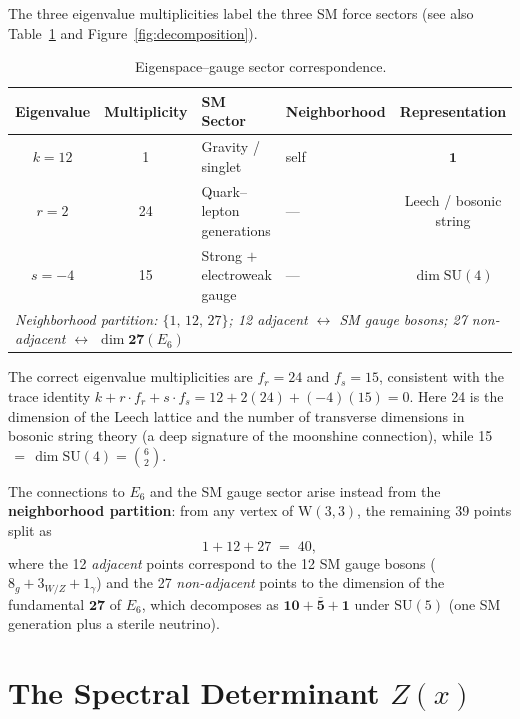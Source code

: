 \documentclass[12pt,a4paper]{article}
\newcommand{\W}{\mathrm{W}(3,3)}
\begin{document}
The three eigenvalue multiplicities label the three SM force sectors
(see also Table~\ref{tab:sectors} and Figure~\ref{fig:decomposition}).

\begin{table}[H]
\centering
\caption{Eigenspace--gauge sector correspondence.}
\label{tab:sectors}
\renewcommand{\arraystretch}{1.25}
\begin{tabular}{@{}ccllc@{}}
\toprule
Eigenvalue & Multiplicity & SM Sector & Neighborhood & Representation \\
\midrule
$k = 12$ & 1 & Gravity / singlet & self & $\mathbf{1}$ \\
$r = 2$ & 24 & Quark--lepton generations & --- & Leech / bosonic string \\
$s = -4$ & 15 & Strong $+$ electroweak gauge & --- & $\dim\mathrm{SU}(4)$ \\
\midrule
\multicolumn{5}{l}{\textit{Neighborhood partition: $\{1,\,12,\,27\}$; 12 adjacent $\leftrightarrow$ SM gauge bosons; 27 non-adjacent $\leftrightarrow$ $\dim\mathbf{27}(E_6)$}}\\
\bottomrule
\end{tabular}
\end{table}

The correct eigenvalue multiplicities are $f_r=24$ and $f_s=15$,
consistent with the trace identity
$k + r\cdot f_r + s\cdot f_s = 12 + 2(24) + (-4)(15) = 0$.
Here 24 is the dimension of the Leech lattice and the number of
transverse dimensions in bosonic string theory (a deep signature
of the moonshine connection), while 15$\,=\,\dim\mathrm{SU}(4)
=\binom{6}{2}$.

The connections to $E_6$ and the SM gauge sector arise instead from
the \textbf{neighborhood partition}: from any vertex of $\W$, the
remaining 39 points split as
\[
  1 + 12 + 27 \;=\; 40,
\]
where the 12 \emph{adjacent} points correspond to the 12 SM gauge
bosons ($8_g + 3_{W/Z} + 1_\gamma$) and the 27 \emph{non-adjacent}
points to the dimension of the fundamental $\mathbf{27}$ of $E_6$,
which decomposes as $\mathbf{10}+\bar{\mathbf{5}}+\mathbf{1}$ under
$\mathrm{SU}(5)$ (one SM generation plus a sterile neutrino).


\section{The Spectral Determinant $Z(x)$}
\label{sec:spectraldet}
\end{document}
